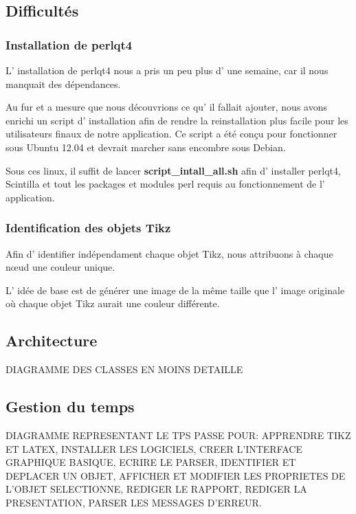 \documentclass[a4paper]{report}
\begin{document}
\subsection{Difficultés} 
\subsubsection{Installation de perlqt4}

L' installation de perlqt4 nous a pris un peu plus d' une semaine,
car il nous manquait des dépendances.

Au fur et a mesure que nous découvrions ce qu' il fallait ajouter,
nous avons enrichi un script d' installation afin de rendre la reinstallation
plus facile pour les utilisateurs finaux de notre application. Ce
script a été conçu pour fonctionner sous Ubuntu 12.04 et devrait marcher
sans encombre sous Debian.

Sous ces linux, il suffit de lancer \textbf{script\_intall\_all.sh}
afin d' installer perlqt4, Scintilla et tout les packages et modules
perl requis au fonctionnement de l' application.

\subsubsection{Identification des objets Tikz}

Afin d' identifier indépendament chaque objet Tikz, nous attribuons à chaque n{\oe}ud une couleur unique.

L' idée de base est de générer une image de la même taille que l'
image originale où chaque objet Tikz aurait une couleur différente. 
\subsection{Architecture}
  DIAGRAMME DES CLASSES EN MOINS DETAILLE   
\subsection{Gestion du temps}
  DIAGRAMME REPRESENTANT LE TPS PASSE POUR: APPRENDRE TIKZ ET LATEX, INSTALLER LES LOGICIELS, CREER L'INTERFACE GRAPHIQUE BASIQUE, ECRIRE LE PARSER, IDENTIFIER ET DEPLACER UN OBJET, AFFICHER ET MODIFIER LES PROPRIETES DE L'OBJET SELECTIONNE, REDIGER LE RAPPORT, REDIGER LA PRESENTATION, PARSER LES MESSAGES D'ERREUR.
\end{document}
